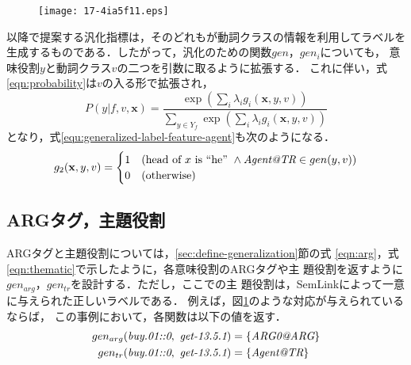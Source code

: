 \documentclass[japanese]{jnlp_1.4}
\begin{document}
\begin{figure}[t]
\begin{center}
\texttt{[image: 17-4ia5f11.eps]}
\end{center}
\label{fig:arg-thematic-mapping}
\end{figure}


以降で提案する汎化指標は，そのどれもが動詞クラスの情報を利用してラベルを
生成するものである．したがって，汎化のための関数$gen$，$gen_{i}$についても，
意味役割$y$と動詞クラス$v$の二つを引数に取るように拡張する．
これに伴い，式\ref{eqn:probability}は$v$の入る形で拡張され，
\begin{equation}
P(y|f,v,\mathbf{x}) =
  \frac{\exp(\sum_{i}\lambda_{i}g_i(\mathbf{x},y,v))}{\sum_{y\in
  Y_f}\exp(\sum_{i}\lambda_{i}g_i(\mathbf{x},y,v))}
\label{eqn:probability2}
\end{equation}
となり，式\ref{equ:generalized-label-feature-agent}も次のようになる．
\begin{equation}
 g_2(\mathbf{x},y,v) = 
  \begin{cases}
   1 & (\mbox{head of }x\mbox{ is ``he''}~\wedge 
      \mbox{\it Agent@TR} \in gen(y,v))\\
   0 & (\mbox{otherwise})
  \end{cases}
\end{equation} 


\subsection{ARGタグ，主題役割}

ARGタグと主題役割については，\ref{sec:define-generalization}節の式
\ref{eqn:arg}，式\ref{eqn:thematic}で示したように，各意味役割のARGタグや主
題役割を返すように$gen_{arg}$，$gen_{tr}$を設計する．ただし，ここでの主
題役割は，SemLinkによって一意に与えられた正しいラベルである．
例えば，図\ref{fig:arg-thematic-mapping}のような対応が与えられているならば，
この事例において，各関数は以下の値を返す．
\begin{align}
gen_{arg}(\mbox{\it buy.01::0}, \mbox{ {\it get-13.5.1}}) & = \{\mbox{\it ARG0@ARG}\}\\
gen_{tr}(\mbox{\it buy.01::0}, \mbox{ {\it get-13.5.1}}) & = \{\mbox{\it Agent@TR}\}
\end{align}
\end{document}
